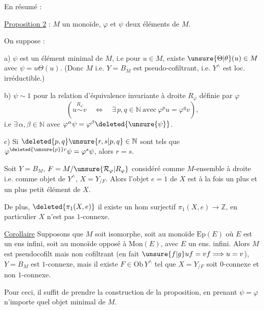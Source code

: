 
En résumé :

\uline{Proposition 2} :  $M$ un monoïde,  $\varphi$ et $\psi$ deux éléments de $M$.

On suppose :

a) $\psi$ est un élément minimal de $M$, i.e pour  $u\in M$, existe $\unsure{\Theta|\theta}(u)\in M$ avec $\psi=u\Theta(u)$. (Donc $M$ i.e. $Y=B_M$ est pseudo-cofiltrant, i.e. $Y^\wedge$ est loc. irréductible.)

b) $\psi\sim1$ pour la relation d'équivalence invariante à droite $R_\varphi$ définie par $\varphi$
\[
(u\overset{R_\varphi}{\sim}v\quad\Longleftrightarrow\quad\exists\,p,q\in\mathbb N\ \text{avec}\ \varphi^p u=\varphi^q v),
\]
i.e $\exists\,\alpha,\beta\in\mathbb N$ avec $\varphi^\alpha\psi=\varphi^\beta\deleted{\unsure{\psi}}$.

c) Si $\deleted{p,q}\unsure{r,s|p,q}\in\mathbb N$ sont tels que $\varphi^{\deleted{\unsure{p}}r}\psi=\varphi^s\psi$, alors $r=s$.

Soit $Y=B_M$, $F=M/\unsure{\mathcal R_\varphi|R_\varphi}$ considéré comme $M$-ensemble à droite i.e. comme objet de $Y^\wedge$, $X=Y_{/F}$. Alors l'objet $e=\dot 1$ de $X$ est à la fois un plus  et un plus petit élément de $X$.

De plus, $\deleted{\pi_{1}(X,e)}$ il existe un hom surjectif $\pi_1(X,e)\longrightarrow\mathbb Z$, en particulier $X$ n'est pas $1$-connexe.


\uline{Corollaire} Supposons que $M$ soit  isomorphe, soit au monoïde $\mathrm{Ep}(E)$ où $E$ est un ens infini, soit au monoïde opposé à $\mathrm{Mon}(E)$, avec $E$ un ens. infini. Alors $M$ est pseudocofilt mais non cofiltrant (en fait $\unsure{f|g}uf=vf\Longrightarrow u=v$), $Y=B_M$ est $1$-connexe, mais il existe $F\in\mathrm{Ob}\,Y^\wedge$ tel que $X=Y_{/F}$ soit $0$-connexe et non $1$-connexe.

Pour ceci, il suffit de prendre  la construction de la proposition, en prenant  $\psi=\varphi$ n'importe quel objet minimal de $M$.

